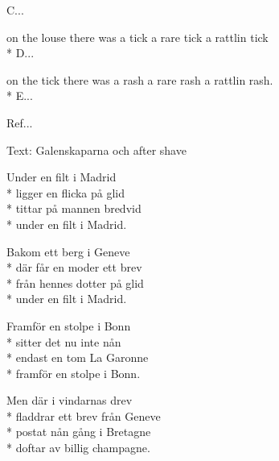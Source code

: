 \begin{SongText}
\begin{SongVerse}
        C...
    \end{SongVerse}
    \begin{SongVerse}
        on the louse there was a tick a rare tick a rattlin tick\\*%
        D...
    \end{SongVerse}
    \begin{SongVerse}
        on the tick there was a rash a rare rash a rattlin rash.\\*%
        E...
    \end{SongVerse}
    \begin{SongVerse}
        Ref...
    \end{SongVerse}
\end{SongText}
\begin{SongText}
    \begin{SongInfo}
        Text: Galenskaparna och after shave
    \end{SongInfo}
    \begin{SongVerse}
        Under en filt i Madrid\\*%
        ligger en flicka på glid\\*%
        tittar på mannen bredvid\\*%
        under en filt i Madrid.
    \end{SongVerse}
    \begin{SongVerse}
        Bakom ett berg i Geneve\\*%
        där får en moder ett brev\\*%
        från hennes dotter på glid\\*%
        under en filt i Madrid.
    \end{SongVerse}
    \begin{SongVerse}
        Framför en stolpe i Bonn\\*%
        sitter det nu inte nån\\*%
        endast en tom La Garonne\\*%
        framför en stolpe i Bonn.
    \end{SongVerse}
    \begin{SongVerse}
        Men där i vindarnas drev\\*%
        fladdrar ett brev från Geneve\\*%
        postat nån gång i Bretagne\\*%
        doftar av billig champagne.
    \end{SongVerse}
    \begin{SongVerse}

\end{SongVerse}
\end{SongText}
